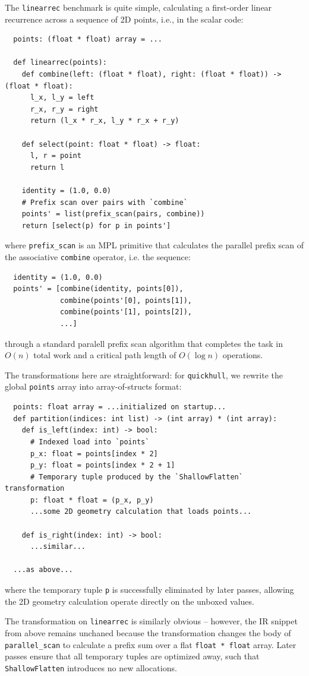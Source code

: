 The \texttt{linearrec} benchmark is quite simple, calculating a first-order
linear recurrence across a sequence of 2D points, i.e., in the scalar code:
\begin{verbatim}
  points: (float * float) array = ...

  def linearrec(points):
    def combine(left: (float * float), right: (float * float)) -> (float * float):
      l_x, l_y = left
      r_x, r_y = right
      return (l_x * r_x, l_y * r_x + r_y)

    def select(point: float * float) -> float:
      l, r = point
      return l

    identity = (1.0, 0.0)
    # Prefix scan over pairs with `combine`
    points' = list(prefix_scan(pairs, combine))
    return [select(p) for p in points']
\end{verbatim}
where \texttt{prefix\_scan} is an MPL primitive that calculates the parallel
prefix scan of the associative \texttt{combine} operator, i.e. the sequence:
\begin{verbatim}
  identity = (1.0, 0.0)
  points' = [combine(identity, points[0]),
             combine(points'[0], points[1]),
             combine(points'[1], points[2]),
             ...]
\end{verbatim}
through a standard paralell prefix scan algorithm that completes the task in
$O(n)$ total work and a critical path length of $O(\log n)$ operations.

The transformations here are straightforward: for \texttt{quickhull}, we rewrite
the global \texttt{points} array into array-of-structs format:
\begin{verbatim}
  points: float array = ...initialized on startup...
  def partition(indices: int list) -> (int array) * (int array):
    def is_left(index: int) -> bool:
      # Indexed load into `points`
      p_x: float = points[index * 2]
      p_y: float = points[index * 2 + 1]
      # Temporary tuple produced by the `ShallowFlatten` transformation
      p: float * float = (p_x, p_y)
      ...some 2D geometry calculation that loads points...

    def is_right(index: int) -> bool:
      ...similar...

  ...as above...
\end{verbatim}
where the temporary tuple \texttt{p} is successfully eliminated by later passes,
allowing the 2D geometry calculation operate directly on the unboxed values.

The transformation on \texttt{linearrec} is similarly obvious -- however, the IR
snippet from above remains unchaned because the transformation changes the body
of \texttt{parallel\_scan} to calculate a prefix sum over a flat \texttt{float *
  float} array. Later passes ensure that all temporary tuples are optimized
away, such that \texttt{ShallowFlatten} introduces no new allocations.

